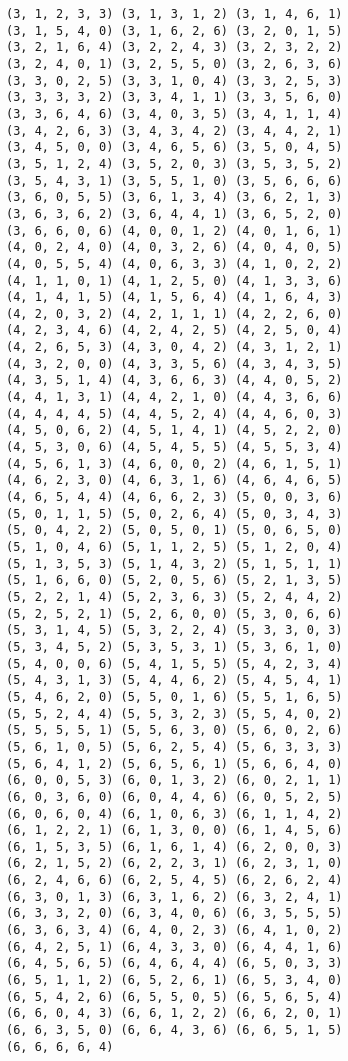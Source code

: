 \documentclass[11pt]{article}
\begin{document}
\begin{Verbatim}[commandchars=\\\{\}]
(3, 1, 2, 3, 3) (3, 1, 3, 1, 2) (3, 1, 4, 6, 1)
(3, 1, 5, 4, 0) (3, 1, 6, 2, 6) (3, 2, 0, 1, 5)
(3, 2, 1, 6, 4) (3, 2, 2, 4, 3) (3, 2, 3, 2, 2)
(3, 2, 4, 0, 1) (3, 2, 5, 5, 0) (3, 2, 6, 3, 6)
(3, 3, 0, 2, 5) (3, 3, 1, 0, 4) (3, 3, 2, 5, 3)
(3, 3, 3, 3, 2) (3, 3, 4, 1, 1) (3, 3, 5, 6, 0)
(3, 3, 6, 4, 6) (3, 4, 0, 3, 5) (3, 4, 1, 1, 4)
(3, 4, 2, 6, 3) (3, 4, 3, 4, 2) (3, 4, 4, 2, 1)
(3, 4, 5, 0, 0) (3, 4, 6, 5, 6) (3, 5, 0, 4, 5)
(3, 5, 1, 2, 4) (3, 5, 2, 0, 3) (3, 5, 3, 5, 2)
(3, 5, 4, 3, 1) (3, 5, 5, 1, 0) (3, 5, 6, 6, 6)
(3, 6, 0, 5, 5) (3, 6, 1, 3, 4) (3, 6, 2, 1, 3)
(3, 6, 3, 6, 2) (3, 6, 4, 4, 1) (3, 6, 5, 2, 0)
(3, 6, 6, 0, 6) (4, 0, 0, 1, 2) (4, 0, 1, 6, 1)
(4, 0, 2, 4, 0) (4, 0, 3, 2, 6) (4, 0, 4, 0, 5)
(4, 0, 5, 5, 4) (4, 0, 6, 3, 3) (4, 1, 0, 2, 2)
(4, 1, 1, 0, 1) (4, 1, 2, 5, 0) (4, 1, 3, 3, 6)
(4, 1, 4, 1, 5) (4, 1, 5, 6, 4) (4, 1, 6, 4, 3)
(4, 2, 0, 3, 2) (4, 2, 1, 1, 1) (4, 2, 2, 6, 0)
(4, 2, 3, 4, 6) (4, 2, 4, 2, 5) (4, 2, 5, 0, 4)
(4, 2, 6, 5, 3) (4, 3, 0, 4, 2) (4, 3, 1, 2, 1)
(4, 3, 2, 0, 0) (4, 3, 3, 5, 6) (4, 3, 4, 3, 5)
(4, 3, 5, 1, 4) (4, 3, 6, 6, 3) (4, 4, 0, 5, 2)
(4, 4, 1, 3, 1) (4, 4, 2, 1, 0) (4, 4, 3, 6, 6)
(4, 4, 4, 4, 5) (4, 4, 5, 2, 4) (4, 4, 6, 0, 3)
(4, 5, 0, 6, 2) (4, 5, 1, 4, 1) (4, 5, 2, 2, 0)
(4, 5, 3, 0, 6) (4, 5, 4, 5, 5) (4, 5, 5, 3, 4)
(4, 5, 6, 1, 3) (4, 6, 0, 0, 2) (4, 6, 1, 5, 1)
(4, 6, 2, 3, 0) (4, 6, 3, 1, 6) (4, 6, 4, 6, 5)
(4, 6, 5, 4, 4) (4, 6, 6, 2, 3) (5, 0, 0, 3, 6)
(5, 0, 1, 1, 5) (5, 0, 2, 6, 4) (5, 0, 3, 4, 3)
(5, 0, 4, 2, 2) (5, 0, 5, 0, 1) (5, 0, 6, 5, 0)
(5, 1, 0, 4, 6) (5, 1, 1, 2, 5) (5, 1, 2, 0, 4)
(5, 1, 3, 5, 3) (5, 1, 4, 3, 2) (5, 1, 5, 1, 1)
(5, 1, 6, 6, 0) (5, 2, 0, 5, 6) (5, 2, 1, 3, 5)
(5, 2, 2, 1, 4) (5, 2, 3, 6, 3) (5, 2, 4, 4, 2)
(5, 2, 5, 2, 1) (5, 2, 6, 0, 0) (5, 3, 0, 6, 6)
(5, 3, 1, 4, 5) (5, 3, 2, 2, 4) (5, 3, 3, 0, 3)
(5, 3, 4, 5, 2) (5, 3, 5, 3, 1) (5, 3, 6, 1, 0)
(5, 4, 0, 0, 6) (5, 4, 1, 5, 5) (5, 4, 2, 3, 4)
(5, 4, 3, 1, 3) (5, 4, 4, 6, 2) (5, 4, 5, 4, 1)
(5, 4, 6, 2, 0) (5, 5, 0, 1, 6) (5, 5, 1, 6, 5)
(5, 5, 2, 4, 4) (5, 5, 3, 2, 3) (5, 5, 4, 0, 2)
(5, 5, 5, 5, 1) (5, 5, 6, 3, 0) (5, 6, 0, 2, 6)
(5, 6, 1, 0, 5) (5, 6, 2, 5, 4) (5, 6, 3, 3, 3)
(5, 6, 4, 1, 2) (5, 6, 5, 6, 1) (5, 6, 6, 4, 0)
(6, 0, 0, 5, 3) (6, 0, 1, 3, 2) (6, 0, 2, 1, 1)
(6, 0, 3, 6, 0) (6, 0, 4, 4, 6) (6, 0, 5, 2, 5)
(6, 0, 6, 0, 4) (6, 1, 0, 6, 3) (6, 1, 1, 4, 2)
(6, 1, 2, 2, 1) (6, 1, 3, 0, 0) (6, 1, 4, 5, 6)
(6, 1, 5, 3, 5) (6, 1, 6, 1, 4) (6, 2, 0, 0, 3)
(6, 2, 1, 5, 2) (6, 2, 2, 3, 1) (6, 2, 3, 1, 0)
(6, 2, 4, 6, 6) (6, 2, 5, 4, 5) (6, 2, 6, 2, 4)
(6, 3, 0, 1, 3) (6, 3, 1, 6, 2) (6, 3, 2, 4, 1)
(6, 3, 3, 2, 0) (6, 3, 4, 0, 6) (6, 3, 5, 5, 5)
(6, 3, 6, 3, 4) (6, 4, 0, 2, 3) (6, 4, 1, 0, 2)
(6, 4, 2, 5, 1) (6, 4, 3, 3, 0) (6, 4, 4, 1, 6)
(6, 4, 5, 6, 5) (6, 4, 6, 4, 4) (6, 5, 0, 3, 3)
(6, 5, 1, 1, 2) (6, 5, 2, 6, 1) (6, 5, 3, 4, 0)
(6, 5, 4, 2, 6) (6, 5, 5, 0, 5) (6, 5, 6, 5, 4)
(6, 6, 0, 4, 3) (6, 6, 1, 2, 2) (6, 6, 2, 0, 1)
(6, 6, 3, 5, 0) (6, 6, 4, 3, 6) (6, 6, 5, 1, 5)
(6, 6, 6, 6, 4)
    \end{Verbatim}
\end{document}
